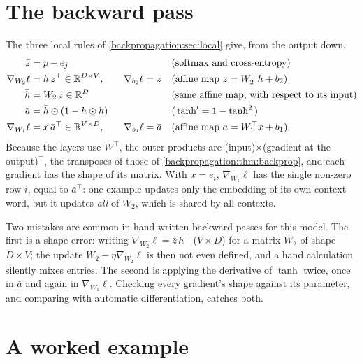 \begin{notechapter}
\section{The backward pass}\label{bigram-neural:sec:backward}

The three local rules of \cref{backpropagation:sec:local} give, from the output down,
\begin{align*}
  \bar z &= p - e_j &&\text{(softmax and cross-entropy)}\\
  \nabla_{W_2}\ell &= h\,\bar z^\top\in\mathbb{R}^{D\times V},\qquad\nabla_{b_2}\ell = \bar z &&\text{(affine map }z = W_2^\top h + b_2\text{)}\\
  \bar h &= W_2\,\bar z\in\mathbb{R}^D &&\text{(same affine map, with respect to its input)}\\
  \bar a &= \bar h\odot(1 - h\odot h) &&\text{(}\tanh' = 1 - \tanh^2\text{)}\\
  \nabla_{W_1}\ell &= x\,\bar a^\top\in\mathbb{R}^{V\times D},\qquad\nabla_{b_1}\ell = \bar a &&\text{(affine map }a = W_1^\top x + b_1\text{)}.
\end{align*}
Because the layers use $W^\top$, the outer products are (input)$\times$(gradient at the output)$^\top$, the
transposes of those of \cref{backpropagation:thm:backprop}, and each gradient has the shape of its
matrix. With $x = e_i$, $\nabla_{W_1}\ell$ has the single non-zero row $i$, equal to $\bar a^\top$: one example updates only the
embedding of its own context word, but it updates \emph{all} of $W_2$, which is shared by all
contexts.

\begin{pitfall}
Two mistakes are common in hand-written backward passes for this model. The first is a shape error: writing $\nabla_{W_2}\ell = \bar z\,h^\top$ ($V\times D$)
for a matrix $W_2$ of shape $D\times V$; the update $W_2 - \eta\nabla_{W_2}\ell$ is then not even defined, and a hand calculation
silently mixes entries. The second is applying the derivative of $\tanh$ twice, once in $\bar a$ and
again in $\nabla_{W_1}\ell$. Checking every gradient's shape against its parameter, and comparing with
automatic differentiation, catches both.
\end{pitfall}

\section{A worked example}\label{bigram-neural:sec:example}


\end{notechapter}
